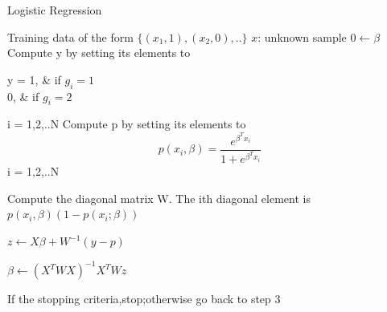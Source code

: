 \documentclass[a4paper]{article}
\begin{document}
  \begin{algorithm}
   \caption{Logistic Regression  ~\cite{logistic1
   } }
    \begin{algorithmic}[1]
    \INPUT 
    \Statex Training data of the form $\{(x_{1},1),(x_{2},0),..\}$
    \Statex  $x$: unknown sample
    \State $0 \leftarrow \beta$
 \State Compute y by setting its elements to
   \begin{numcases}{ y =}
  1, & if $g_{i} = 1 $\\
  0, &  if $g_{i} = 2 $
\end{numcases}
 i = 1,2,..N
 \State Compute p by setting its elements to
 $$p(x_{i},\beta) = \frac{e^{\beta^{T}x_{i}}}{1+ e^{\beta^{T}x_{i}}} $$   i = 1,2,..N
 
\State Compute the diagonal matrix W. The ith diagonal element is  $p(x_{i},\beta)(1-p(x_{i};\beta))$
    
\State $z \leftarrow X\beta + W ^{-1}(y - p) $

\State $\beta \leftarrow (X^{T}WX)^{-1}X^{T}Wz$

\State If the stopping criteria,stop;otherwise go back to step 3
    
     
       
        


\end{algorithmic}
\end{algorithm}
\end{document}
